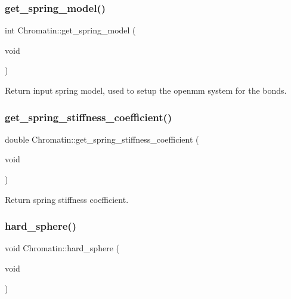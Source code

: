 \subsubsection{\texorpdfstring{get\_spring\_model()}{get\_spring\_model()}}
{\footnotesize\ttfamily int Chromatin\+::get\+\_\+spring\+\_\+model (\begin{DoxyParamCaption}\item[{void}]{ }\end{DoxyParamCaption})\hspace{0.3cm}{\ttfamily [inline]}}

Return input spring model, used to setup the openmm system for the bonds. \mbox{\label{classChromatin_a766c38975df75204e517629f55226f36}} 
\subsubsection{\texorpdfstring{get\_spring\_stiffness\_coefficient()}{get\_spring\_stiffness\_coefficient()}}
{\footnotesize\ttfamily double Chromatin\+::get\+\_\+spring\+\_\+stiffness\+\_\+coefficient (\begin{DoxyParamCaption}\item[{void}]{ }\end{DoxyParamCaption})\hspace{0.3cm}{\ttfamily [inline]}}

Return spring stiffness coefficient. \mbox{\label{classChromatin_aba53b27dd0a93bbd93fe619390e54749}} 
\subsubsection{\texorpdfstring{hard\_sphere()}{hard\_sphere()}}
{\footnotesize\ttfamily void Chromatin\+::hard\+\_\+sphere (\begin{DoxyParamCaption}\item[{void}]{ }\end{DoxyParamCaption})}

\mbox{\label{classChromatin_a398e59a7a3ce36b0cb74dae0cfbba295}} 
